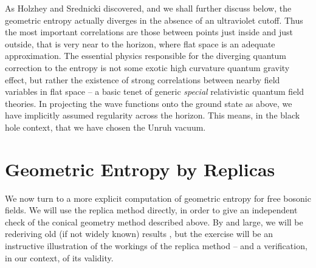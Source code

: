 \documentclass[12pt]{article}
\begin{document}
%
As Holzhey and Srednicki discovered, and we shall further discuss below, the
geometric entropy actually diverges in the absence of an ultraviolet
cutoff. Thus the most important correlations are those between points
just inside and just outside, that is very near to the horizon, where flat
space is an adequate approximation. The essential physics responsible for the
diverging quantum correction to the entropy is not some exotic high curvature
quantum gravity effect, but rather the existence of strong correlations between
nearby field variables in flat space -- a basic tenet of generic {\it
special\/}
relativistic quantum field theories. In projecting the wave functions onto the
ground state as above, we have implicitly assumed
regularity across the horizon.  This means, in the black hole
context, that we have chosen the Unruh vacuum.


\section{Geometric Entropy by Replicas}

We now turn to a more explicit computation of geometric entropy for free
bosonic fields. We will use the replica method directly, in order to give an
independent check of the conical geometry method described above.
By and large, we will be rederiving old (if not widely known) results
\cite{Bombelli}, but the exercise will be an instructive illustration of
the workings of the replica method -- and a verification, in our
context, of its validity.
\end{document}
